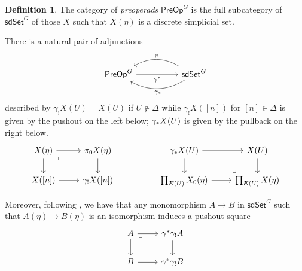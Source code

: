 \documentclass[a4paper,10pt
,draft
]{article}%
\numberwithin{equation}{section}
\numberwithin{figure}{section}
\theoremstyle{definition} %
\newtheorem{definition}[equation]{Definition}%
\newcommand{\1}{\ensuremath{\mathbbm 1}}%
\begin{document}
\begin{definition}
      The category of \textit{preoperads} $\mathsf{PreOp}^G$ is the full subcategory of $\mathsf{sdSet}^G$ of those $X$ such that
      $X(\eta)$ is a discrete simplicial set.

      There is a natural pair of adjunctions
      \[
            \begin{tikzcd}[column sep =5em]
                  \mathsf{PreOp}^G \ar{r}[swap]{\gamma^{\**}} 
                  &
                  \mathsf{sdSet}^G
                  \ar[bend right]{l}[swap,midway]{\gamma_{!}}
                  \ar[bend left]{l}{\gamma_{\**}}
            \end{tikzcd}
      \]
      described by
      $\gamma_{!}X (U) = X(U)$ if $U \not \in \Delta$
      while $\gamma_{!}X ([n])$ for $[n] \in \Delta$ is given by the pushout on the left below; 
      $\gamma_{\**}X(U)$ is given by the pullback on the right below.
      \begin{equation}\label{GAMMASTAR_EQ}
            \begin{tikzcd}
                  X(\eta) \ar{r} \ar{d} \arrow[dr, phantom, "\ulcorner", very near start]  &
                  \pi_0 X(\eta) \ar{d}
                  && 
                  \gamma_{\**}X(U) \ar{r} \ar{d} & X(U) \ar{d}
                  \\
                  X([n]) \ar{r} & \gamma_! X([n]) 
                  &&
                  \prod_{\boldsymbol{E}(U)} X_0(\eta) \ar{r} &
                  \prod_{\boldsymbol{E}(U)} X(\eta)
                  \arrow[lu, phantom, "\lrcorner", very near start]
            \end{tikzcd}
      \end{equation}

      Moreover, following \cite[Remark 4.33]{BP_edss}, %
      we have that any monomorphism $A \to B$ in $\mathsf{sdSet}^G$
      such that $A(\eta) \to B(\eta)$ is an isomorphism
      induces a pushout square
      \begin{equation}\label{GAMMASH EQ}
            \begin{tikzcd}
                  A \ar{r} \ar{d} \arrow[dr, phantom, "\ulcorner", very near start]&
                  \gamma^{\**}\gamma_! A \ar{d}
                  \\
                  B \ar{r} & \gamma^{\**}\gamma_! B 
            \end{tikzcd}
      \end{equation}
\end{definition}
\end{document}
